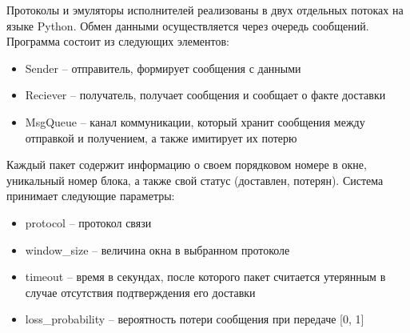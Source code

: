 Протоколы и эмуляторы исполнителей реализованы в двух отдельных потоках на языке Python. Обмен данными осуществляется через очередь сообщений. Программа состоит из следующих элементов:

\begin{itemize}
	\item Sender -- отправитель, формирует сообщения с данными
	\item Reciever -- получатель, получает сообщения и сообщает о факте
	доставки
	\item MsgQueue -- канал коммуникации, который хранит сообщения между
	отправкой и получением, а также имитирует их потерю
\end{itemize}

Каждый пакет содержит информацию о своем порядковом номере в
окне, уникальный номер блока, а также свой статус (доставлен, потерян).
Система принимает следующие параметры:

\begin{itemize}
	\item protocol -- протокол связи
	\item window\_size -- величина окна в выбранном протоколе
	\item timeout -- время в секундах, после которого пакет считается утерянным в случае отсутствия подтверждения его доставки
	\item loss\_probability -- вероятность потери сообщения при передаче [0, 1]
\end{itemize}